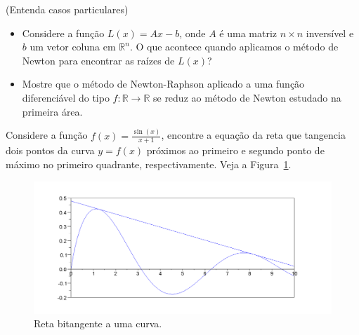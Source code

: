 \begin{exer}(Entenda casos particulares)
\begin{itemize}
\item Considere a função $L(x)=Ax-b$, onde $A$ é uma matriz $n\times n$ inversível e $b$ um vetor coluna em $\mathbb{R}^n$. O que acontece quando aplicamos o método de Newton para encontrar as raízes de $L(x)$?
\item Mostre que o método de Newton-Raphson aplicado a uma função diferenciável do tipo $f:\mathbb{R}\to\mathbb{R}$ se reduz ao método de Newton estudado na primeira área.
\end{itemize}

\end{exer}


\begin{exer}\label{prob_bitang}Considere a função $f(x)=\frac{\sin(x)}{x+1}$, encontre a equação da reta que tangencia dois pontos da curva $y=f(x)$ próximos ao primeiro e segundo ponto de máximo no primeiro quadrante, respectivamente. Veja a Figura~\ref{pic:bitang}.
\end{exer}
\begin{figure}
        \centering
	    \includegraphics[width=\textwidth]{cap_nlinsis/pics/curva_Q23}
		\caption{Reta bitangente a uma curva.}
		\label{pic:bitang}
	\end{figure}

